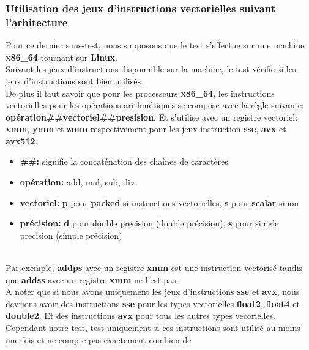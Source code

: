 \documentclass[11pt]{article}
\begin{document}
\subsubsection{Utilisation des jeux d'instructions vectorielles suivant l'arhitecture}
\label{sec:orgf847cb5}

Pour ce dernier sous-test, nous supposons que le test s'effectue
sur une machine \textbf{x86\_64} tournant sur \textbf{Linux}.
\\ \vspace{5mm}
Suivant les jeux d'instructions disponnible sur la machine, le
test vérifie si les jeux d'instructions sont bien utilisés.
\\ \vspace{5mm}
De plus il faut savoir que pour les processeurs \textbf{x86\_64}, les
instructions vectorielles pour les opérations arithmétiques 
se compose avec la règle suivante:
\textbf{opération\#\#vectoriel\#\#presision}.
Et s'utilise avec un registre vectoriel: \textbf{xmm}, \textbf{ymm} et \textbf{zmm}
respectivement pour les jeux instruction \textbf{sse}, \textbf{avx} et \textbf{avx512}.
\begin{itemize}
\item \textbf{\#\#:} signifie la concaténation des chaînes de caractères
\item \textbf{opération:} add, mul, sub, div
\item \textbf{vectoriel:} \textbf{p} pour \textbf{packed} si instructions vectorielles,
\textbf{s} pour \textbf{scalar} sinon
\item \textbf{précision:} \textbf{d} pour double precision (double précision), \textbf{s} pour simgle
precision (simple précision)
\end{itemize}
\\ \vspace{5mm}
Par exemple, \textbf{addps} avec un registre \textbf{xmm} est une instruction
vectorisé tandis que \textbf{addss} avec un registre \textbf{xmm} ne l'est pas.
\\ \vspace{5mm}
A noter que si nous avons uniquement les jeux d'instructions
\textbf{sse} et \textbf{avx}, nous devrions avoir des instructions \textbf{sse} pour
les types vectorielles \textbf{float2}, \textbf{float4} et \textbf{double2}. Et des
instructions \textbf{avx} pour tous les autres types vecorielles.
\\ \vspace{5mm}
Cependant notre test, test uniquement si ces instructions sont
utilisé au moins une fois et ne compte pas exactement combien de
\end{document}
